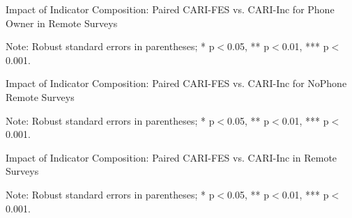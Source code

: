 \documentclass[11pt,harvard]{article}
\begin{document}
\begin{table}[htbp]
	\centering
	\begin{adjustbox}{max width=\textwidth}
		\begin{threeparttable}
			\caption{Impact of Indicator Composition: Paired CARI-FES vs. CARI-Inc for Phone Owner in Remote Surveys}
			\scriptsize
			 
			\label{tab:CAR_RM_Paired_OwnPhone_ttest}
			\begin{tablenotes}
				\item Note: Robust standard errors in parentheses; * p$<$0.05, ** p$<$0.01, *** p$<$0.001. 
			\end{tablenotes}
		\end{threeparttable}
	\end{adjustbox}
\end{table}


\begin{table}[htbp]
	\centering
	\begin{adjustbox}{max width=\textwidth}
		\begin{threeparttable}
			\caption{Impact of Indicator Composition: Paired CARI-FES vs. CARI-Inc for NoPhone Remote Surveys}
			\scriptsize
			 
			\label{tab:CAR_RM_Paired_NoPhone_ttest}
			\begin{tablenotes}
				\item Note: Robust standard errors in parentheses; * p$<$0.05, ** p$<$0.01, *** p$<$0.001. 
			\end{tablenotes}
		\end{threeparttable}
	\end{adjustbox}
\end{table}

\begin{table}[htbp]
	\centering
	\begin{adjustbox}{max width=\textwidth}
		\begin{threeparttable}
			\caption{Impact of Indicator Composition: Paired CARI-FES vs. CARI-Inc in Remote Surveys}
			\scriptsize
			 
			\label{tab:CAR_RM_Paired_ttest}
			\begin{tablenotes}
				\item Note: Robust standard errors in parentheses; * p$<$0.05, ** p$<$0.01, *** p$<$0.001. 
			\end{tablenotes}
		\end{threeparttable}
	\end{adjustbox}
\end{table}
\end{document}
